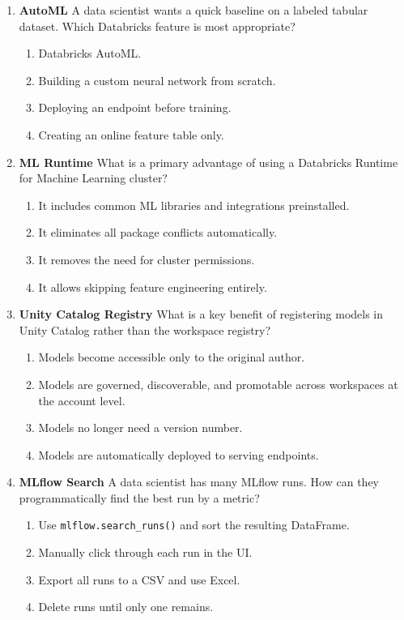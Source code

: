 \documentclass{article}
\begin{document}
\begin{enumerate}[label=\textbf{Q\arabic*.}]
		\item \textbf{AutoML}
		A data scientist wants a quick baseline on a labeled tabular dataset. Which Databricks feature is most appropriate?
		\begin{enumerate}[label=\Alph*.]
			\item Databricks AutoML.
			\item Building a custom neural network from scratch.
			\item Deploying an endpoint before training.
			\item Creating an online feature table only.
		\end{enumerate}
		
		\item \textbf{ML Runtime}
		What is a primary advantage of using a Databricks Runtime for Machine Learning cluster?
		\begin{enumerate}[label=\Alph*.]
			\item It includes common ML libraries and integrations preinstalled.
			\item It eliminates all package conflicts automatically.
			\item It removes the need for cluster permissions.
			\item It allows skipping feature engineering entirely.
		\end{enumerate}
		
		\item \textbf{Unity Catalog Registry}
		What is a key benefit of registering models in Unity Catalog rather than the workspace registry?
		\begin{enumerate}[label=\Alph*.]
			\item Models become accessible only to the original author.
			\item Models are governed, discoverable, and promotable across workspaces at the account level.
			\item Models no longer need a version number.
			\item Models are automatically deployed to serving endpoints.
		\end{enumerate}
		
		\item \textbf{MLflow Search}
		A data scientist has many MLflow runs. How can they programmatically find the best run by a metric?
		\begin{enumerate}[label=\Alph*.]
			\item Use \texttt{mlflow.search\_runs()} and sort the resulting DataFrame.
			\item Manually click through each run in the UI.
			\item Export all runs to a CSV and use Excel.
			\item Delete runs until only one remains.
		\end{enumerate}
		

\end{enumerate}
\end{document}
